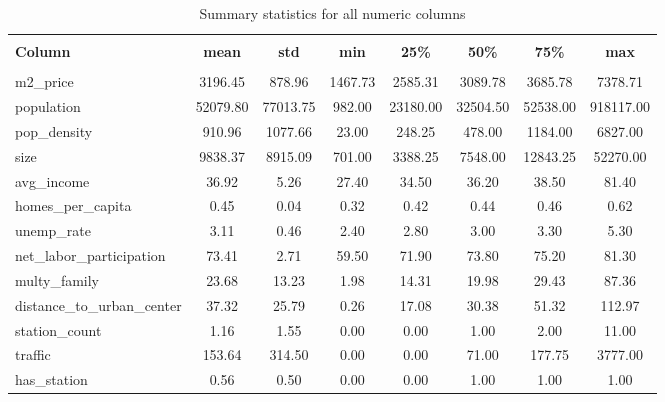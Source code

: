
    \begin{table}
      \centering 
      \caption{Summary statistics for all numeric columns} 
      \vspace{10pt}
      \label{tab:summary_statistics} 
      \begin{tabular}{@{\extracolsep{5pt}} lccccccc} 
      \hline 
      \hline \\[-1.8ex] 
      \textbf{Column} & \textbf{mean} & \textbf{std} & \textbf{min} & \textbf{25\%} & \textbf{50\%} & \textbf{75\%} & \textbf{max} \\ 
      \hline \\[-1.8ex] 
    m2\_price & 3196.45 & 878.96 & 1467.73 & 2585.31 & 3089.78 & 3685.78 & 7378.71 \\ 
population & 52079.80 & 77013.75 & 982.00 & 23180.00 & 32504.50 & 52538.00 & 918117.00 \\ 
pop\_density & 910.96 & 1077.66 & 23.00 & 248.25 & 478.00 & 1184.00 & 6827.00 \\ 
size & 9838.37 & 8915.09 & 701.00 & 3388.25 & 7548.00 & 12843.25 & 52270.00 \\ 
avg\_income & 36.92 & 5.26 & 27.40 & 34.50 & 36.20 & 38.50 & 81.40 \\ 
homes\_per\_capita & 0.45 & 0.04 & 0.32 & 0.42 & 0.44 & 0.46 & 0.62 \\ 
unemp\_rate & 3.11 & 0.46 & 2.40 & 2.80 & 3.00 & 3.30 & 5.30 \\ 
net\_labor\_participation & 73.41 & 2.71 & 59.50 & 71.90 & 73.80 & 75.20 & 81.30 \\ 
multy\_family & 23.68 & 13.23 & 1.98 & 14.31 & 19.98 & 29.43 & 87.36 \\ 
distance\_to\_urban\_center & 37.32 & 25.79 & 0.26 & 17.08 & 30.38 & 51.32 & 112.97 \\ 
station\_count & 1.16 & 1.55 & 0.00 & 0.00 & 1.00 & 2.00 & 11.00 \\ 
traffic & 153.64 & 314.50 & 0.00 & 0.00 & 71.00 & 177.75 & 3777.00 \\ 
has\_station & 0.56 & 0.50 & 0.00 & 0.00 & 1.00 & 1.00 & 1.00 \\ 

      \hline 
      \hline 
      \end{tabular} 
    \end{table} 
    